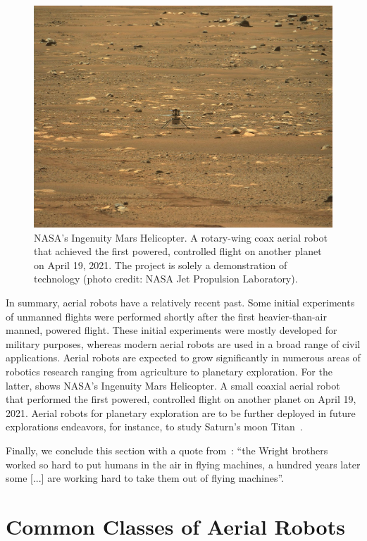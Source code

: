 \begin{figure}[t]
  \centering
  \includegraphics[width=.7\textwidth]{pictures/jpegPIA24550}
  \caption[NASA's Ingenuity Mars Helicopter]{NASA's Ingenuity Mars Helicopter. A rotary-wing coax aerial robot that achieved the first powered, controlled flight on another planet on April 19, 2021. The project is solely a demonstration of technology {\scriptsize(photo credit: NASA Jet Propulsion Laboratory)}.}   
  \label{fig:ingenuity}
\end{figure}

In summary, aerial robots have a relatively recent past. Some initial experiments of unmanned flights were performed shortly after the first heavier-than-air manned, powered flight. These initial experiments were mostly developed for military purposes, whereas modern aerial robots are used in a broad range of civil applications. Aerial robots are expected to grow significantly in numerous areas of robotics research ranging from agriculture to planetary exploration. For the latter,  shows NASA's Ingenuity Mars Helicopter. A small coaxial aerial robot that performed the first powered, controlled flight on another planet on April 19, 2021. Aerial robots for planetary exploration are to be further deployed in future explorations endeavors, for instance, to study Saturn's moon Titan~\citep{voosen2019nasa}.

Finally, we conclude this section with a quote from~\citep{anderson2005introduction}: ``the Wright brothers worked so hard to put humans in the air in flying machines, a hundred years later some [...] are working hard to take them out of flying machines''.


\section{Common Classes of Aerial Robots}
\label{sec:aerial-robo-types}

